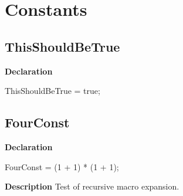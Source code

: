 \documentclass{report}
\newif\ifpdf
\begin{document}
\section{Constants}
\ifpdf
\subsection*{\large{\textbf{ThisShouldBeTrue}}\normalsize\hspace{1ex}\hrulefill}
\else
\subsection*{ThisShouldBeTrue}
\fi
\label{ok_macros-ThisShouldBeTrue}
\begin{list}{}{
\setlength{\itemindent}{0cm}
\setlength{\listparindent}{0cm}
\setlength{\leftmargin}{\evensidemargin}
\addtolength{\leftmargin}{\tmplength}
\settowidth{\labelsep}{X}
\addtolength{\leftmargin}{\labelsep}
\setlength{\labelwidth}{\tmplength}
}
\item[\textbf{Declaration}\hfill]
\ifpdf
\begin{flushleft}
\fi
\begin{ttfamily}
ThisShouldBeTrue = true;\end{ttfamily}

\ifpdf
\end{flushleft}
\fi

\end{list}
\ifpdf
\subsection*{\large{\textbf{FourConst}}\normalsize\hspace{1ex}\hrulefill}
\else
\subsection*{FourConst}
\fi
\label{ok_macros-FourConst}
\begin{list}{}{
\setlength{\itemindent}{0cm}
\setlength{\listparindent}{0cm}
\setlength{\leftmargin}{\evensidemargin}
\addtolength{\leftmargin}{\tmplength}
\settowidth{\labelsep}{X}
\addtolength{\leftmargin}{\labelsep}
\setlength{\labelwidth}{\tmplength}
}
\item[\textbf{Declaration}\hfill]
\ifpdf
\begin{flushleft}
\fi
\begin{ttfamily}
FourConst =  (1 + 1) * (1 + 1);\end{ttfamily}

\ifpdf
\end{flushleft}
\fi

\par
\item[\textbf{Description}]
Test of recursive macro expansion.

\end{list}
\ifpdf
\end{document}
